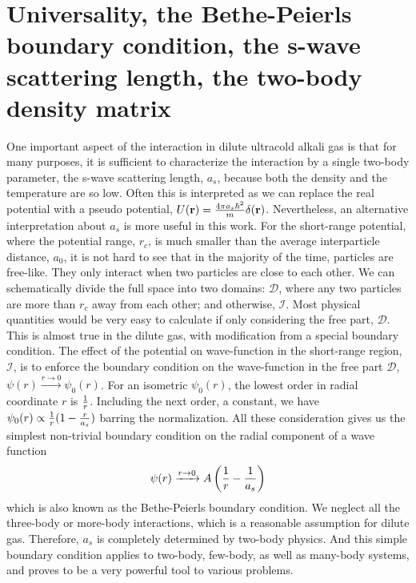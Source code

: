 \section{Universality,  the Bethe-Peierls boundary condition, the s-wave scattering length, the two-body density matrix\label{sec:intro:as}}
One important aspect of the interaction in dilute ultracold alkali gas is that for many purposes, it is sufficient to characterize the interaction  by a single two-body parameter, the s-wave scattering length, $a_s$,  because  both the density and the temperature are so low.  Often this is  interpreted as we can replace the real potential with a pseudo potential, $U(\mathbf{r})=\frac{4\pi{}a_{s}\hbar^{2}}{m}\delta(\mathbf{r})$\cite{pethick, LeggettBEC}.  Nevertheless, an alternative interpretation about $a_s$ \cite{LeggettBEC, Tan2008-1,Tan2008-2,CombescotTan} is more useful in this work.  For the short-range potential, where the potential range, $r_c$, is much smaller than the average interparticle distance, $a_0$, it is not hard to see that in the majority of the time, particles are free-like.  They only interact  when two particles are close to each other.  We can schematically divide the full space into two domains: $\mathcal{D}$, where any two particles are more than $r_c$ away from each other; and otherwise, $\mathcal{I}$. Most physical quantities would be very easy to calculate if only considering the free part, $\mathcal{D}$.  This is almost true in the dilute gas, with modification from a special  boundary condition.  The effect of the potential on wave-function in the short-range region, $\mathcal{I}$, is to enforce the boundary condition on the wave-function in the free part $\mathcal{D}$, $\psi(r)\xrightarrow{r\to0}\psi_{0}(r)$.  For an isometric $\psi_{0}(r)$, the lowest order in radial coordinate $r$ is $\frac{1}{r}$.   Including the next order, a constant,  we have $\psi_{0}(r)\propto\frac{1}{r}(1-\frac{r}{a_{s}})$ barring the normalization.  All these consideration gives us the simplest non-trivial boundary condition on the radial component of a wave function
\begin{equation}\label{eq:intro:Bethe}
\psi(r)\xrightarrow{r\to0}A\left(\frac{1}{r}-\frac{1}{a_s}\right)
\end{equation}
which is also known as the Bethe-Peierls boundary condition\cite{BethePeierls}.  We neglect all the three-body or more-body interactions, which is a reasonable assumption for  dilute gas. Therefore,  $a_{s}$ is completely determined by two-body physics.  And   this simple boundary condition applies to two-body, few-body, as well as many-body systems, and proves to be a very powerful tool to various problems.  

